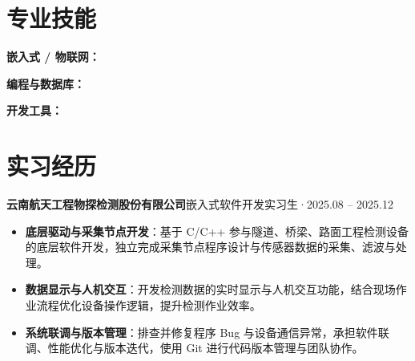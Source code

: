 \documentclass[10pt,a4paper]{article}
\begin{document}
\section{\faCogs\hspace{0.4em}专业技能}

{\bfseries\color{primary}嵌入式 / 物联网：}

\vspace{2pt}

{\bfseries\color{primary}编程与数据库：}

\vspace{2pt}

{\bfseries\color{primary}开发工具：}

\section{\faBriefcase\hspace{0.4em}实习经历}

{\bfseries 云南航天工程物探检测股份有限公司}\hfill{\color{graytext}嵌入式软件开发实习生\hspace{0.3em}·\hspace{0.3em}2025.08 -- 2025.12}

\vspace{2pt}

\begin{itemize}[leftmargin=1.5em, itemsep=1pt, parsep=0pt, topsep=2pt]
    \item \textbf{底层驱动与采集节点开发}：基于 C/C++ 参与隧道、桥梁、路面工程检测设备的底层软件开发，独立完成采集节点程序设计与传感器数据的采集、滤波与处理。
    \item \textbf{数据显示与人机交互}：开发检测数据的实时显示与人机交互功能，结合现场作业流程优化设备操作逻辑，提升检测作业效率。
    \item \textbf{系统联调与版本管理}：排查并修复程序 Bug 与设备通信异常，承担软件联调、性能优化与版本迭代，使用 Git 进行代码版本管理与团队协作。
\end{itemize}
\end{document}
